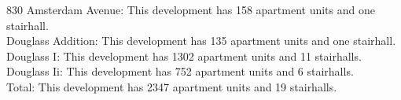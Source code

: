 {830 Amsterdam Avenue}: This development has 158 apartment units and one stairhall.\\{Douglass Addition}: This development has 135 apartment units and one stairhall.\\{Douglass I}: This development has 1302 apartment units and 11 stairhalls.\\{Douglass Ii}: This development has 752 apartment units and 6 stairhalls.\\{Total}: This development has 2347 apartment units and 19 stairhalls.\\